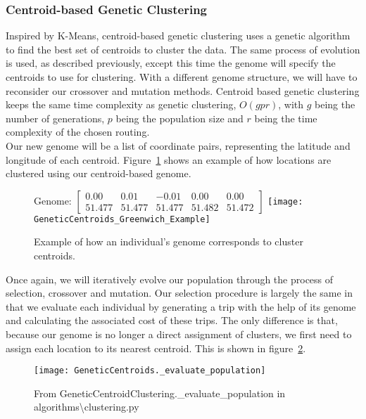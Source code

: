 
\subsubsection{Centroid-based Genetic Clustering}
Inspired by K-Means, centroid-based genetic clustering uses a genetic algorithm to find the best set of centroids
to cluster the data.
The same process of evolution is used, as described previously, except this time the genome will specify the
centroids to use for clustering.
With a different genome structure, we will have to reconsider our crossover and mutation methods.
Centroid based genetic clustering keeps the same time complexity as genetic clustering, $O(gpr)$, with $g$ being the
number of generations, $p$ being the population size and $r$ being the time complexity of the chosen routing.\\

\noindent
Our new genome will be a list of coordinate pairs, representing the latitude and longitude of each centroid.
Figure~\ref{fig:GeneticCentroids_Greenwich_Example} shows an example of how locations are clustered using our centroid-based genome.
\begin{figure}[H]
    \centering
    Genome: $\begin{bmatrix}0.00 & 0.01 & -0.01 & 0.00 & 0.00\\51.477 & 51.477 & 51.477 & 51.482 & 51.472\end{bmatrix}$
    \texttt{[image: GeneticCentroids\_Greenwich\_Example]}
    \caption{Example of how an individual's genome corresponds to cluster centroids.}
    \label{fig:GeneticCentroids_Greenwich_Example}
\end{figure}

\noindent
Once again, we will iteratively evolve our population through the process of selection, crossover and mutation.
Our selection procedure is largely the same in that we evaluate each individual by generating a trip with the help
of its genome and calculating the associated cost of these trips.
The only difference is that, because our genome is no longer a direct assignment of clusters, we first need to
assign each location to its nearest centroid.
This is shown in figure~\ref{fig:GeneticCentroids._evaluate_population}.
\begin{figure}
    \centering
    \texttt{[image: GeneticCentroids.\_evaluate\_population]}
    \caption{From GeneticCentroidClustering.\_evaluate\_population in algorithms\textbackslash clustering.py}
    \label{fig:GeneticCentroids._evaluate_population}
\end{figure}

